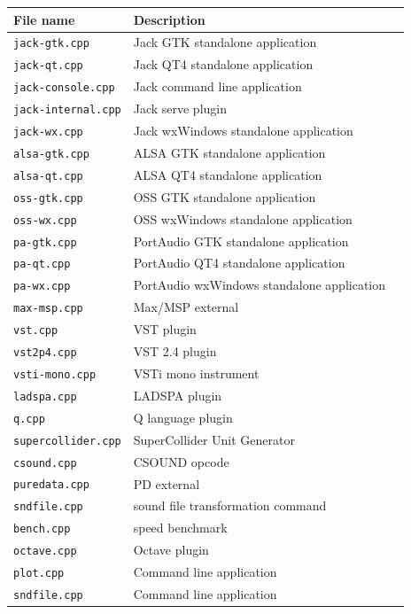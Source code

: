 \documentclass[a4paper]{book}
\begin{document}
\begin{tabular}{|l|l|l|}
\hline
\textbf{File name}			& \textbf{Description}   \\
\hline
\texttt{jack-gtk.cpp} 		& Jack GTK standalone application  \\
\texttt{jack-qt.cpp} 		& Jack QT4 standalone application  \\
\texttt{jack-console.cpp} 	& Jack command line application  \\
\texttt{jack-internal.cpp} 	& Jack serve plugin  \\
\texttt{jack-wx.cpp} 		& Jack wxWindows standalone application  \\
\texttt{alsa-gtk.cpp} 		& ALSA GTK standalone application  \\
\texttt{alsa-qt.cpp} 		& ALSA QT4 standalone application  \\
\texttt{oss-gtk.cpp} 		& OSS GTK standalone application  \\
\texttt{oss-wx.cpp} 		& OSS wxWindows standalone application  \\
\texttt{pa-gtk.cpp} 		& PortAudio GTK standalone application  \\
\texttt{pa-qt.cpp} 			& PortAudio QT4 standalone application  \\
\texttt{pa-wx.cpp} 			& PortAudio wxWindows standalone application  \\
\hline
\texttt{max-msp.cpp} 		& Max/MSP external  \\
\texttt{vst.cpp} 			& VST plugin  \\
\texttt{vst2p4.cpp} 		& VST 2.4 plugin  \\
\texttt{vsti-mono.cpp} 		& VSTi mono instrument  \\
\texttt{ladspa.cpp} 		& LADSPA plugin  \\
\texttt{q.cpp} 				& Q language plugin  \\
\texttt{supercollider.cpp} 	& SuperCollider Unit Generator  \\
\texttt{csound.cpp} 		& CSOUND opcode  \\
\texttt{puredata.cpp} 		& PD external  \\
\hline
\texttt{sndfile.cpp} 		& sound file transformation command \\
\texttt{bench.cpp} 			& speed benchmark   \\
\texttt{octave.cpp} 		& Octave plugin   \\
\texttt{plot.cpp} 			& Command line application    \\
\texttt{sndfile.cpp} 		& Command line application    \\
\hline
\end{tabular}
\end{document}
